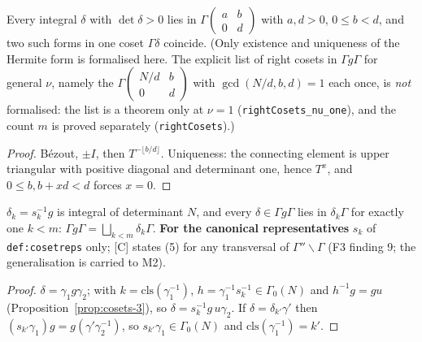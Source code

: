 \begin{proposition}\label{prop:cosets-hermite}
  \leanok
  Every integral $\delta$ with $\det\delta>0$ lies in $\Gamma\left(\begin{smallmatrix}a&b\\0&d\end{smallmatrix}\right)$ with
  $a,d>0$, $0\le b<d$, and two such forms in one coset $\Gamma\delta$ coincide. (Only existence and uniqueness of the Hermite form is formalised here. The explicit list of right cosets in
  $\Gamma g\Gamma$ for general $\nu$, namely the $\Gamma\left(\begin{smallmatrix}N/d&b\\0&d\end{smallmatrix}\right)$ with
  $\gcd(N/d,b,d)=1$ each once, is \emph{not} formalised: the list is a theorem only at $\nu=1$
  (\texttt{rightCosets\_nu\_one}), and the count $m$ is proved separately (\texttt{rightCosets}).)
\end{proposition}
\begin{proof}
  \leanok
  Bézout, $\pm I$, then $T^{-\lfloor b/d\rfloor}$. Uniqueness: the connecting element is upper triangular with positive
  diagonal and determinant one, hence $T^x$, and $0\le b,b+xd<d$ forces $x=0$.
\end{proof}

\begin{proposition}\label{prop:cosets-5}
  \leanok
  $\delta_k=s_k^{-1}g$ is integral of determinant $N$, and every $\delta\in\Gamma g\Gamma$ lies in $\delta_k\Gamma$ for exactly
  one $k<m$: $\Gamma g\Gamma=\bigsqcup_{k<m}\delta_k\Gamma$. \textbf{For the canonical representatives} $s_k$ of
  \texttt{def:cosetreps} only; [C] states (5) for any transversal of $\Gamma''\backslash\Gamma$ (F3 finding 9; the generalisation is
  carried to M2).
\end{proposition}
\begin{proof}
  \leanok
  $\delta=\gamma_1g\gamma_2$; with $k=\mathrm{cls}(\gamma_1^{-1})$, $h=\gamma_1^{-1}s_k^{-1}\in\Gamma_0(N)$ and $h^{-1}g=gu$
  (Proposition~\ref{prop:cosets-3}), so $\delta=s_k^{-1}g\,u\gamma_2$. If $\delta=\delta_{k'}\gamma'$ then
  $(s_{k'}\gamma_1)g=g(\gamma'\gamma_2^{-1})$, so $s_{k'}\gamma_1\in\Gamma_0(N)$ and $\mathrm{cls}(\gamma_1^{-1})=k'$.
\end{proof}

